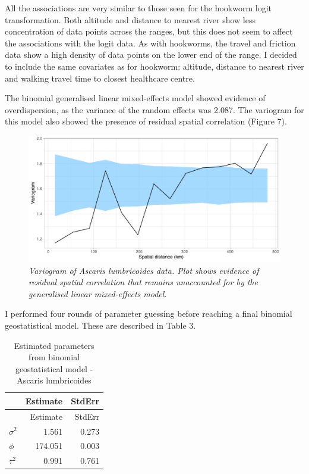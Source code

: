 \documentclass[
]{article}
\begin{document}
All the associations are very similar to those seen for the hookworm
logit transformation. Both altitude and distance to nearest river show
less concentration of data points across the ranges, but this does not
seem to affect the associations with the logit data. As with hookworms,
the travel and friction data show a high density of data points on the
lower end of the range. I decided to include the same covariates as for
hookworm: altitude, distance to nearest river and walking travel time to
closest healthcare centre.

The binomial generalised linear mixed-effects model showed evidence of
overdispersion, as the variance of the random effects was 2.087. The
variogram for this model also showed the presence of residual spatial
correlation (Figure 7).

\begin{figure}
\centering
\includegraphics{write_up_files/figure-latex/Asc.variogram_2-1.pdf}
\caption{\textit{Variogram of Ascaris lumbricoides data. Plot shows evidence of residual spatial correlation that remains unaccounted for by the generalised linear mixed-effects model.}}
\end{figure}

I performed four rounds of parameter guessing before reaching a final
binomial geostatistical model. These are described in Table 3.

\begin{longtable}[]{@{}lrr@{}}
\caption{Estimated parameters from binomial geostatistical model -
Ascaris lumbricoides}\tabularnewline
\toprule
& Estimate & StdErr \\
\midrule
\endfirsthead
\toprule
& Estimate & StdErr \\
\midrule
\endhead
\(\sigma^2\) & 1.561 & 0.273 \\
\(\phi\) & 174.051 & 0.003 \\
\(\tau^2\) & 0.991 & 0.761 \\
\bottomrule
\end{longtable}
\end{document}
